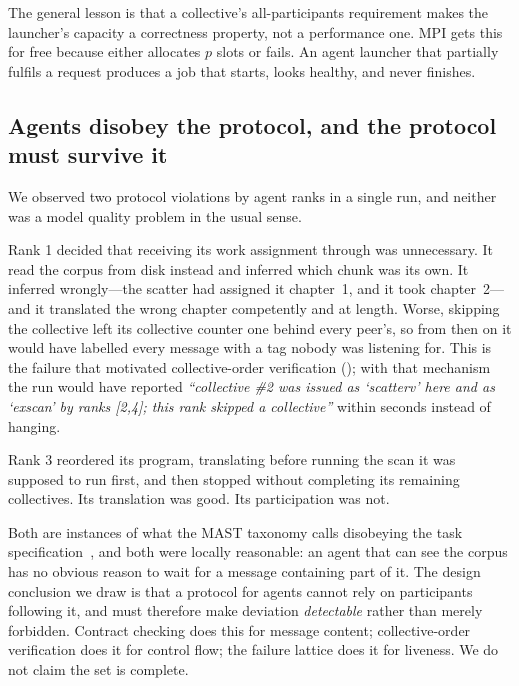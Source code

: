 The general lesson is that a collective's all-participants requirement makes
the launcher's capacity a correctness property, not a performance one. MPI
gets this for free because  either allocates $p$ slots or
fails. An agent launcher that partially fulfils a request produces a job
that starts, looks healthy, and never finishes.

\subsection{Agents disobey the protocol, and the protocol must survive it}
\label{sec:discussion-disobedience}

We observed two protocol violations by agent ranks in a single run, and
neither was a model quality problem in the usual sense.

Rank 1 decided that receiving its work assignment through  was unnecessary. It read the corpus from disk instead and inferred
which chunk was its own. It inferred wrongly---the scatter had assigned it
chapter~1, and it took chapter~2---and it translated the wrong chapter
competently and at length. Worse, skipping the collective left its
collective counter one behind every peer's, so from then on it would have
labelled every message with a tag nobody was listening for. This is the
failure that motivated collective-order verification
(); with that mechanism the run would have reported
\emph{``collective \#2 was issued as `scatterv' here and as `exscan' by
ranks [2,4]; this rank skipped a collective''} within seconds instead of
hanging.

Rank 3 reordered its program, translating before running the scan it was
supposed to run first, and then stopped without completing its remaining
collectives. Its translation was good. Its participation was not.

Both are instances of what the MAST taxonomy calls disobeying the task
specification~\cite{cemri2025mast}, and both were locally reasonable: an
agent that can see the corpus has no obvious reason to wait for a message
containing part of it. The design conclusion we draw is that a protocol for
agents cannot rely on participants following it, and must therefore make
deviation \emph{detectable} rather than merely forbidden. Contract checking
does this for message content; collective-order verification does it for
control flow; the failure lattice does it for liveness. We do not claim the
set is complete.

